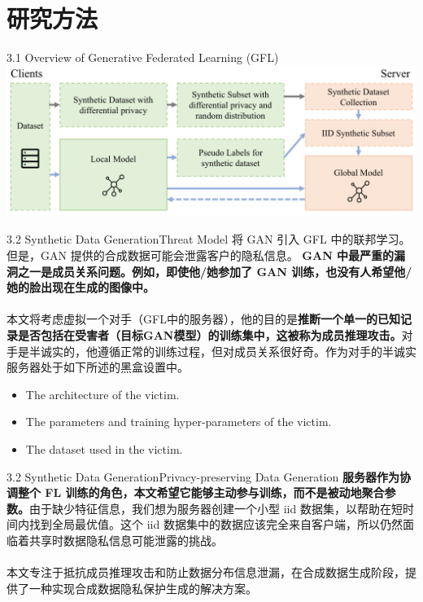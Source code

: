\documentclass{sintefbeamer}
\theoremstyle{definition}
\begin{document}
\section{研究方法}

\begin{frame}{3.1  Overview of Generative Federated Learning (GFL)}
\centering
\includegraphics[width=1\textwidth]{images/gfl_overview}

\end{frame}

	
\begin{frame}{3.2 Synthetic Data Generation}{Threat Model}
	将 GAN 引入 GFL 中的联邦学习。但是，GAN 提供的合成数据可能会泄露客户的隐私信息。 \textbf{GAN 中最严重的漏洞之一是成员关系问题。例如，即使他/她参加了 GAN 训练，也没有人希望他/她的脸出现在生成的图像中。}
		\\ \hspace*{\fill} \\
	本文将考虑虚拟一个对手（GFL中的服务器），他的目的是\textbf{推断一个单一的已知记录是否包括在受害者（目标GAN模型）的训练集中，这被称为成员推理攻击。}对手是半诚实的，他遵循正常的训练过程，但对成员关系很好奇。作为对手的半诚实服务器处于如下所述的黑盒设置中。

\begin{itemize}
\item The architecture of the victim.
\item The parameters and training hyper-parameters of the victim.
\item The dataset used in the victim.
\end{itemize}

\end{frame}

\begin{frame}{3.2 Synthetic Data Generation}{Privacy-preserving Data Generation}
\textbf{服务器作为协调整个 FL 训练的角色，本文希望它能够主动参与训练，而不是被动地聚合参数。}由于缺少特征信息，我们想为服务器创建一个小型 iid 数据集，以帮助在短时间内找到全局最优值。这个 iid 数据集中的数据应该完全来自客户端，所以仍然面临着共享时数据隐私信息可能泄露的挑战。
\\ \hspace*{\fill} \\
本文专注于抵抗成员推理攻击和防止数据分布信息泄漏，在合成数据生成阶段，提供了一种实现合成数据隐私保护生成的解决方案。


\end{frame}
\end{document}
